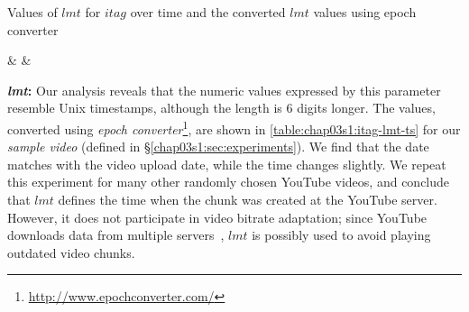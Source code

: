 \begin{table}[!t]
 \small
\caption{\small{Values of $lmt$ for $itag$ over time and the converted $lmt$ values using epoch converter}}
\label{table:chap03s1:itag-lmt-ts}
 \centering
{\csvcoli & \csvcolii & \csvcoliii}%
\end{table}


{\bf {\em lmt}:} Our analysis reveals that the numeric values expressed by this parameter resemble Unix timestamps, although the length is $6$ digits longer.
The values, converted using {\em epoch converter}\footnote{\url{http://www.epochconverter.com/}}, are shown in \tbl\ref{table:chap03s1:itag-lmt-ts} for our {\it sample video} (defined in \S\ref{chap03s1:sec:experiments}).
We find that the date matches with the video upload date, while the time changes slightly.
We repeat this experiment for many other randomly chosen YouTube videos, and conclude that $lmt$ defines the time when the chunk was created at the YouTube server.
However, it does not participate in video bitrate adaptation; since YouTube downloads data from multiple servers~\cite{krishnappa2013dashing}, $lmt$ is possibly used to avoid playing outdated video chunks.

